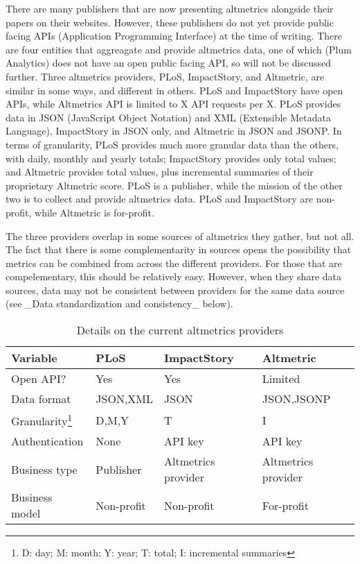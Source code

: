 \documentclass[letterpaper,superscriptaddress,showkeys,longbibliography]{revtex4-1}
\begin{document}
There are many publishers that are now presenting altmetrics alongside their papers on their websites. However, these publishers do not yet provide public facing APIs (Application Programming Interface) at the time of writing. There are four entities that aggreagate and provide altmetrics data, one of which (Plum Analytics) does not have an open public facing API, so will not be discussed further.  Three altmetrics providers, PLoS, ImpactStory, and Altmetric, are similar in some ways, and different in others. PLoS and ImpactStory have open APIs, while Altmetrics API is limited to X API requests per X. PLoS provides data in JSON (JavaScript Object Notation) and XML (Extensible Metadata Language), ImpactStory in JSON only, and Altmetric in JSON and JSONP. In terms of granularity, PLoS provides much more granular data than the others, with daily, monthly and yearly totals; ImpactStory provides only total values; and Altmetric provides total values, plus incremental summaries of their proprietary Altmetric score. PLoS is a publisher, while the mission of the other two is to collect and provide altmetrics data. PLoS and ImpactStory are non-profit, while Altmetric is for-profit.

The three providers overlap in some sources of altmetrics they gather, but not all. The fact that there is some complementarity in sources opens the possibility that metrics can be combined from across the different providers. For those that are compelementary, this should be relatively easy. However, when they share data sources, data may not be consistent between providers for the same data source (see \_Data standardization and consistency\_ below).


\begin{table}[!ht]
\caption{Details on the current altmetrics providers}\label{tab:a} %
\begin{tabular}{|l|l|l|l|}
\hline
Variable & PLoS & ImpactStory & Altmetric  \\
\hline
Open API? & Yes & Yes & Limited \\
Data format & JSON,XML & JSON & JSON,JSONP \\
Granularity\footnote{D: day; M: month; Y: year; T: total; I: incremental summaries} & D,M,Y & T & I \\
Authentication & None & API key & API key \\
Business type & Publisher & Altmetrics provider & Altmetrics provider \\
Business model & Non-profit & Non-profit & For-profit \\
\hline
\end{tabular}
\end{table}
\end{document}
